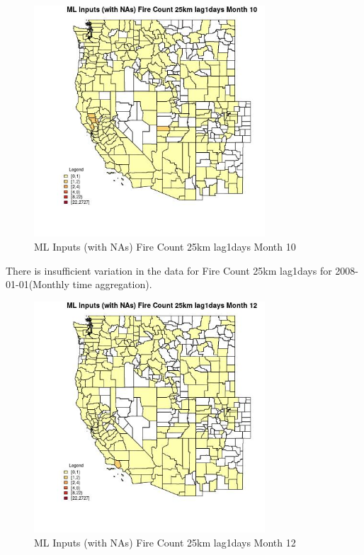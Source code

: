 \begin{figure} 
\centering  
\includegraphics[width=0.77\textwidth]{Code_Outputs/Report_ML_input_PM25_Step4_part_f_de_duplicated_aves_prioritize_24hr_obswNAs_CountyFire_Count_25km_lag1daysmedianMonth10.jpg} 
\caption{\label{fig:Report_ML_input_PM25_Step4_part_f_de_duplicated_aves_prioritize_24hr_obswNAsCountyFire_Count_25km_lag1daysmedianMonth10}ML Inputs (with NAs) Fire Count 25km lag1days Month 10} 
\end{figure} 
 

There is insufficient variation in the data for Fire Count 25km lag1days for 2008-01-01(Monthly time aggregation). 
 

\begin{figure} 
\centering  
\includegraphics[width=0.77\textwidth]{Code_Outputs/Report_ML_input_PM25_Step4_part_f_de_duplicated_aves_prioritize_24hr_obswNAs_CountyFire_Count_25km_lag1daysmedianMonth12.jpg} 
\caption{\label{fig:Report_ML_input_PM25_Step4_part_f_de_duplicated_aves_prioritize_24hr_obswNAsCountyFire_Count_25km_lag1daysmedianMonth12}ML Inputs (with NAs) Fire Count 25km lag1days Month 12} 
\end{figure} 
 

